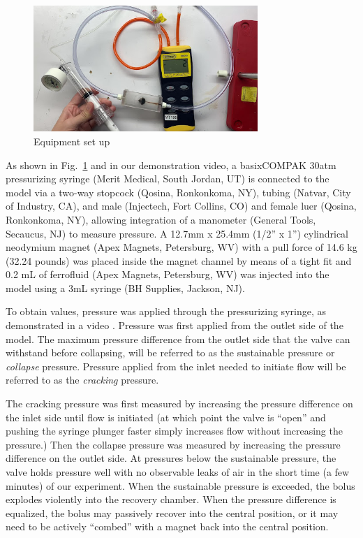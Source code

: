 \documentclass{asme2ej}
\begin{document}
\begin{figure}
\centerline{\includegraphics[width=3.34in]{figure/Figure2.jpeg}}
\caption{Equipment set up}
\label{fig_equipment}
\end{figure}

As shown in Fig.~\ref{fig_equipment} and in our demonstration video\cite{stuckey2021video},
a basixCOMPAK 30atm pressurizing syringe (Merit Medical, South Jordan,
UT) is connected to the model via a two-way stopcock (Qosina,
Ronkonkoma, NY), tubing (Natvar, City of Industry, CA), and male
(Injectech, Fort Collins, CO) and female luer (Qosina, Ronkonkoma,
NY), allowing integration of a manometer (General Tools, Secaucus, NJ)
to measure pressure. A 12.7mm x 25.4mm (1/2” x 1”)
cylindrical neodymium magnet (Apex
Magnets, Petersburg, WV) with a pull force of 14.6 kg (32.24 pounds)
was placed inside the magnet channel by means
of a tight fit and 0.2 mL of ferrofluid (Apex Magnets, Petersburg, WV)
was injected into the model using a 3mL syringe (BH Supplies, Jackson,
NJ).

To obtain values, pressure was applied through the pressurizing
syringe, as demonstrated in a video \cite{stuckey2021video}.
Pressure was first applied from the outlet side of the model.
The maximum pressure difference from the outlet side that the
valve can withstand before collapsing, will be referred to as the
sustainable pressure or {\em collapse} pressure.
Pressure applied from the inlet needed to
initiate flow will be referred to as the {\em cracking} pressure.

The cracking pressure was first measured by increasing the pressure
difference on the inlet side until flow is initiated (at which point
the valve is ``open'' and
pushing the syringe plunger faster simply increases flow without
increasing the pressure.) Then the
collapse pressure was measured by increasing the pressure
difference on the outlet side. At pressures below the sustainable
pressure, the valve holds pressure well with no observable leaks of
air in the short time (a few minutes) of our experiment. When the
sustainable pressure is exceeded, the bolus explodes violently into
the recovery chamber. When the pressure difference is equalized, the
bolus may passively recover into the central position, or it may need
to be actively “combed” with a magnet back into the central position.
\end{document}

